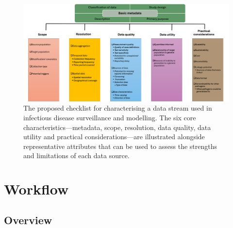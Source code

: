 \documentclass{article}
\begin{document}
\begin{figure}[H] 
\includegraphics[width=1\linewidth]{figures/data_characteristics_2.png}
\centering
\caption{The proposed checklist for characterising a data stream used in infectious disease surveillance and modelling. The six core characteristics---metadata, scope, resolution, data quality, data utility and practical considerations---are illustrated alongside representative attributes that can be used to assess the strengths and limitations of each data source. }
\label{data_characteristics}
\end{figure}


\section{Workflow}
\label{sec:workflow}

\subsection{Overview}
\end{document}

